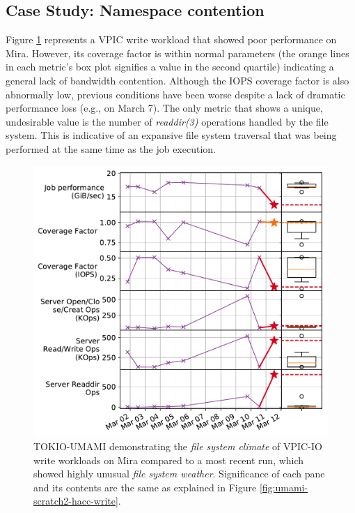 \subsection{Case Study: Namespace contention}

Figure \ref{fig:umami-mira-fs1-vpic-write} represents a VPIC write workload
that showed poor performance on Mira.
However, its coverage factor is within normal parameters (the orange lines in each metric's box plot signifies a value in the second quartile) indicating a general lack of bandwidth contention.
Although the IOPS coverage factor is also abnormally low, previous conditions have been worse despite a lack of dramatic performance loss (e.g., on March 7).
The only metric that shows a unique, undesirable value is the number of \emph{readdir(3)} operations handled by the file system.
This is indicative of an expansive file system traversal that was being performed at the same time as the job execution.

\begin{figure}[t]
    \centering
    \includegraphics[width=1.0\columnwidth]{figs/umami-mira-fs1-vpic-write.pdf}
    \caption{TOKIO-UMAMI demonstrating the \emph{file system climate} of VPIC-IO write workloads on Mira compared to a most recent run, which showed highly unusual \emph{file system weather}.
    Significance of each pane and its contents are the same as explained in Figure \ref{fig:umami-scratch2-hacc-write}.}
    \label{fig:umami-mira-fs1-vpic-write}
\end{figure}

